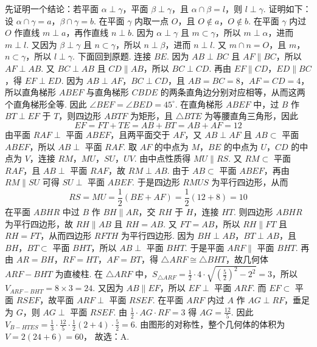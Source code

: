 \begin{solution}
先证明一个结论：若平面 \(\alpha\perp\gamma\)，平面 \(\beta\perp\gamma\)，且 \(\alpha\cap\beta=l\)，则 \(l\perp\gamma\). 证明如下：设 \(\alpha\cap\gamma=a\)，\(\beta\cap\gamma=b\). 在平面 \(\gamma\) 内取一点 \(O\)，且 \(O\notin a\)，\(O\notin b\). 在平面 \(\gamma\) 内过 \(O\) 作直线 \(m\perp a\)，再作直线 \(n\perp b\). 因为 \(\alpha\perp\gamma\) 且 \(m\subset\gamma\)，所以 \(m\perp\alpha\)，进而 \(m\perp l\). 又因为 \(\beta\perp\gamma\) 且 \(n\subset\gamma\)，所以 \(n\perp\beta\)，进而 \(n\perp l\). 又 \(m\cap n=O\)，且 \(m\)，\(n\subset\gamma\)，所以 \(l\perp\gamma\). 下面回到原题. 连接 \(BE\). 因为 \(AB\perp BC\) 且 \(AF\parallel BC\)，所以 \(AF\perp AB\). 又 \(BC\perp AB\) 且 \(CD\parallel AB\)，所以 \(BC\perp CD\). 再由 \(EF\parallel CD\)，\(ED\parallel BC\)，得 \(EF\perp ED\). 因为 \(AB\perp AF\)，\(BC\perp CD\)，且 \(AB=BC=8\)，\(AF=CD=4\)，所以直角梯形 \(ABEF\) 与直角梯形 \(CBDE\) 的两条直角边分别对应相等，从而这两个直角梯形全等. 因此 \(\angle BEF=\angle BED=45^\circ\). 在直角梯形 \(ABEF\) 中，过 \(B\) 作 \(BT\perp EF\) 于 \(T\)，则四边形 \(ABTF\) 为矩形，且 \(\triangle BTE\) 为等腰直角三角形，因此
\[EF=FT+TE=AB+BT=AB+AF=12\]
由平面 \(RAF\perp\) 平面 \(ABEF\)，且两平面交于 \(AF\)，又 \(AB\perp AF\) 且 \(AB\subset\) 平面 \(ABEF\)，所以 \(AB\perp\) 平面 \(RAF\). 取 \(AF\) 的中点为 \(M\)，\(BE\) 的中点为 \(U\)，\(CD\) 的中点为 \(V\)，连接 \(RM\)，\(MU\)，\(SU\)，\(UV\). 由中点性质得 \(MU\parallel RS\). 又 \(RM\subset\) 平面 \(RAF\)，且 \(AB\perp\) 平面 \(RAF\)，故 \(RM\perp AB\). 由于 \(AB\subset\) 平面 \(ABEF\)，再由 \(RM\parallel SU\) 可得 \(SU\perp\) 平面 \(ABEF\). 于是四边形 \(RMUS\) 为平行四边形，从而
\[
RS=MU=\frac12\left( BE+AF \right)=\frac12\left( 12+8 \right)=10
\]
在平面 \(ABHR\) 中过 \(B\) 作 \(BH\parallel AR\)，交 \(RH\) 于 \(H\)，连接 \(HT\). 则四边形 \(ABHR\) 为平行四边形，故 \(RH\parallel AB\) 且 \(RH=AB\). 又 \(FT=AB\)，所以 \(RH\parallel FT\) 且 \(RH=FT\)，从而四边形 \(RFTH\) 为平行四边形. 因为 \(BH\perp AB\)，\(BT\perp AB\)，且 \(BH\)，\(BT\subset\) 平面 \(BHT\)，所以 \(AB\perp\) 平面 \(BHT\). 于是平面 \(ARF\parallel\) 平面 \(BHT\). 再由 \(AR=BH\)，\(RF=HT\)，\(AF=BT\)，得 \(\triangle ARF\cong\triangle BHT\)，故几何体 \(ARF-BHT\) 为直棱柱. 在 \(\triangle ARF\) 中，\(S_{\triangle ARF}=\frac12\cdot 4\cdot \sqrt{\left(\frac52\right)^2-2^2}=3\)，所以 \(V_{ARF-BHT}=8\times 3=24\). 又因为 \(AB\parallel EF\)，所以 \(EF\perp\) 平面 \(ARF\). 而 \(EF\subset\) 平面 \(RSEF\)，故平面 \(ARF\perp\) 平面 \(RSEF\). 在平面 \(ARF\) 内过 \(A\) 作 \(AG\perp RF\)，垂足为 \(G\)，则 \(AG\perp\) 平面 \(RSEF\). 由 \(\frac12\cdot AG\cdot RF=3\) 得 \(AG=\frac{12}{5}\). 因此 \(V_{B-HTES}=\frac13\cdot \frac{12}{5}\cdot \frac12(2+4)\cdot \frac52=6\). 由图形的对称性，整个几何体的体积为
\(
V=2(24+6)=60
\)，
故选：A.
\end{solution}
